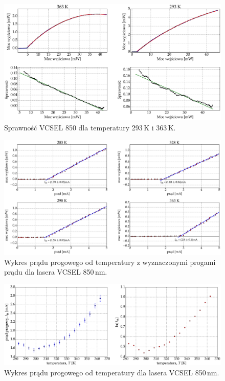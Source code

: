 \begin{figure}
\center
  \includegraphics[scale=0.30]{plot_vcsel_850/plot_eff_20_90_via_power.eps}
  \caption{Sprawność VCSEL 850 dla temperatury 293\,K i 363\,K.}
  \label{vcsel_850_rys_5}
\end{figure}
\begin{figure}
\center
  \includegraphics[scale=0.30]{plot_vcsel_850/plot_fit_i_th.eps}
  \caption{Wykres prądu progowego od temperatury z wyznaczonymi progami prądu dla lasera VCSEL 850\,nm.}
  \label{vcsel_850_rys_6}
\end{figure}
\begin{figure}
\center
  \includegraphics[scale=0.30]{plot_vcsel_850/plot_temp_i_th_log_lin.eps}
  \caption{Wykres prądu progowego od temperatury dla lasera VCSEL 850\,nm.}
  \label{vcsel_850_rys_7}
\end{figure}
